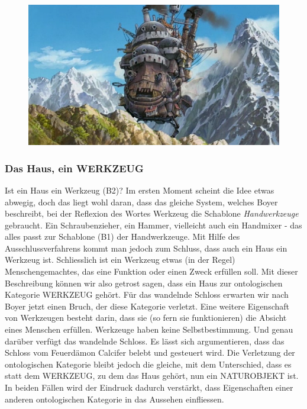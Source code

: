\begin{figure}
  \centering
  \includegraphics[width=.8\linewidth]{images/00-36-10_castle.png}
  \label{fig:test2}
\end{figure}

\subsubsection{Das Haus, ein WERKZEUG} 
Ist ein Haus ein Werkzeug (B2)? Im ersten Moment scheint die Idee etwas abwegig, doch das liegt wohl daran, dass das gleiche System, welches Boyer beschreibt, bei der Reflexion des Wortes Werkzeug die Schablone \emph{Handwerkzeuge} gebraucht. Ein Schraubenzieher, ein Hammer, vielleicht auch ein Handmixer - das alles passt zur Schablone (B1) der Handwerkzeuge. Mit Hilfe des Ausschlussverfahrens kommt man jedoch zum Schluss, dass auch ein Haus ein Werkzeug ist. Schliesslich ist ein Werkzeug etwas (in der Regel) Menschengemachtes, das eine Funktion oder einen Zweck erfüllen soll. Mit dieser Beschreibung können wir also getrost sagen, dass ein Haus zur ontologischen Kategorie WERKZEUG gehört. Für das wandelnde Schloss erwarten wir nach Boyer jetzt einen Bruch, der diese Kategorie verletzt. Eine weitere Eigenschaft von Werkzeugen besteht darin, dass sie (so fern sie funktionieren) die Absicht eines Menschen erfüllen. Werkzeuge haben keine Selbstbestimmung. Und genau darüber verfügt das wandelnde Schloss. Es lässt sich argumentieren, dass das Schloss vom Feuerdämon Calcifer belebt und gesteuert wird. Die Verletzung der ontologischen Kategorie bleibt jedoch die gleiche, mit dem Unterschied, dass es statt dem WERKZEUG, zu dem das Haus gehört, nun ein NATUROBJEKT ist. In beiden Fällen wird der Eindruck dadurch verstärkt, dass Eigenschaften einer anderen ontologischen Kategorie in das Aussehen einfliessen. 


